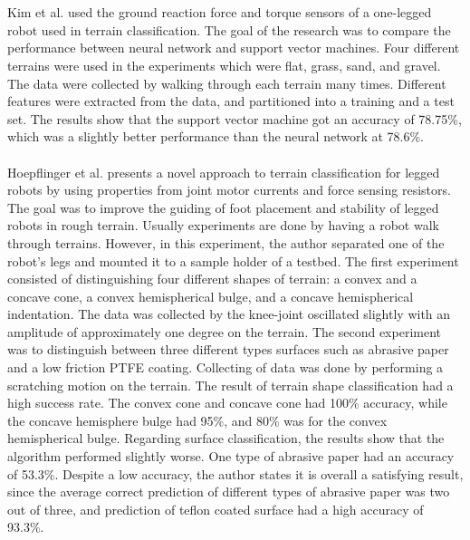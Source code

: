 \documentclass[USenglish]{ifimaster}  %
\begin{document}
\\
\\
Kim et al. \cite{5602459} used the ground reaction force and torque sensors of a one-legged robot used in terrain classification. The goal of the research was to compare the performance between neural network and support vector machines. Four different terrains were used in the experiments which were flat, grass, sand, and gravel. The data were collected by walking through each terrain many times. Different features were extracted from the data, and partitioned into a training and a test set. The results show that the support vector machine got an accuracy of 78.75\%, which was a slightly better performance than the neural network at 78.6\%.
\\
\\
Hoepflinger et al. \cite{5509309} presents a novel approach to terrain classification for legged robots by using properties from joint motor currents and force sensing resistors. The goal was to improve the guiding of foot placement and stability of legged robots in rough terrain. Usually experiments are done by having a robot walk through terrains. However, in this experiment, the author separated one of the robot’s legs and mounted it to a sample holder of a testbed. The first experiment consisted of distinguishing four different shapes of terrain: a convex and a concave cone, a convex hemispherical bulge, and a concave hemispherical indentation. The data was collected by the knee-joint oscillated slightly with an amplitude of approximately one degree on the terrain. The second experiment was to distinguish between three different types surfaces such as abrasive paper and a low friction PTFE coating. Collecting of data was done by performing a scratching motion on the terrain. The result of terrain shape classification had a high success rate. The convex cone and concave cone had 100\% accuracy, while the concave hemisphere bulge had 95\%, and 80\% was for the convex hemispherical bulge. Regarding surface classification, the results show that the algorithm performed slightly worse. One type of abrasive paper had an accuracy of 53.3\%. Despite a low accuracy, the author states it is overall a satisfying result, since the average correct prediction of different types of abrasive paper was two out of three, and prediction of teflon coated surface had a high accuracy of 93.3\%.
 
\end{document}

